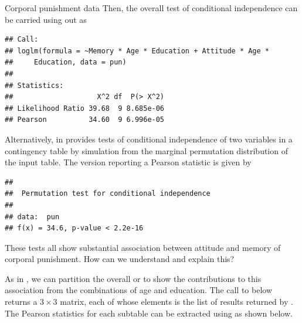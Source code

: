 \documentclass[11pt]{book}
\renewenvironment{knitrout}{\small\renewcommand{\baselinestretch}{.85}}{} %
\begin{document}
\begin{Example}[punish]{Corporal punishment data}
Then, the overall test of conditional independence can be carried using  out as
\begin{knitrout}
\color{fgcolor}\begin{kframe}
\begin{alltt}
 \hlkwb{<-} \hlstd{(}\hlopt{~} \hlopt{*}\hlopt{*} \hlopt{+} \hlopt{*}\hlopt{*}
                    
\end{alltt}
\begin{verbatim}
## Call:
## loglm(formula = ~Memory * Age * Education + Attitude * Age * 
##     Education, data = pun)
## 
## Statistics:
##                    X^2 df  P(> X^2)
## Likelihood Ratio 39.68  9 8.685e-06
## Pearson          34.60  9 6.996e-05
\end{verbatim}
\end{kframe}
\end{knitrout}
Alternatively,  in  
provides tests of conditional independence of two variables in a contingency table by simulation from the marginal permutation
distribution of the input table.  The version reporting a Pearson \chisq
statistic is given by
\begin{knitrout}
\color{fgcolor}\begin{kframe}
\begin{alltt}
\hlstd{(}\hlstd{)}
 \hlstd{=}\hlstd{(}\hlstd{,} \hlstd{),}
              \hlstd{=} \hlstd{(}\hlstd{)} \hlopt{^}\hlstd{),} 
\end{alltt}
\begin{verbatim}
## 
## 	Permutation test for conditional independence
## 
## data:  pun
## f(x) = 34.6, p-value < 2.2e-16
\end{verbatim}
\end{kframe}
\end{knitrout}
These tests all show substantial association between attitude and memory of corporal
punishment.  How can we understand and explain this?

As in , we can partition the overall \GSQ or \chisq
to show the contributions to this association
from the combinations of age and education.  The call to  below
returns a $3 \times 3$ matrix, each of whose elements is the list of results
returned by .  The Pearson \chisq statistics for each subtable
can be extracted using  as shown below.


\end{Example}
\end{document}
